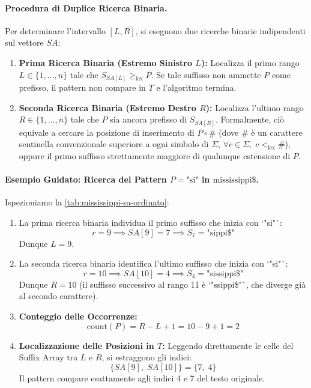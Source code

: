 \paragraph{Procedura di Duplice Ricerca Binaria.}
Per determinare l'intervallo $[L, R]$, si eseguono due ricerche binarie indipendenti sul vettore $SA$:
\begin{enumerate}
  \item \textbf{Prima Ricerca Binaria (Estremo Sinistro $L$):} Localizza il primo rango $L \in \{1, \dots, n\}$ tale che $S_{SA[L]} \ge_{\text{lex}} P$. Se tale suffisso non ammette $P$ come prefisso, il pattern non compare in $T$ e l'algoritmo termina.
  \item \textbf{Seconda Ricerca Binaria (Estremo Destro $R$):} Localizza l'ultimo rango $R \in \{1, \dots, n\}$ tale che $P$ sia ancora prefisso di $S_{SA[R]}$. Formalmente, ci\`o equivale a cercare la posizione di inserimento di $P \circ \#$ (dove $\#$ \`e un carattere sentinella convenzionale superiore a ogni simbolo di $\Sigma$, $\forall c \in \Sigma, \; c <_{\text{lex}} \#$), oppure il primo suffisso strettamente maggiore di qualunque estensione di $P$.
\end{enumerate}

\paragraph{Esempio Guidato: Ricerca del Pattern $P = \text{"si"}$ in $\text{mississippi}\$$.}
Ispezioniamo la \autoref{tab:mississippi-sa-ordinato}:
\begin{enumerate}
  \item La prima ricerca binaria individua il primo suffisso che inizia con `"si"`:
  \begin{equation}
    r = 9 \implies SA[9] = 7 \implies S_7 = \text{"sippi\$"}
  \end{equation}
  Dunque $L = 9$.
  \item La seconda ricerca binaria identifica l'ultimo suffisso che inizia con `"si"`:
  \begin{equation}
    r = 10 \implies SA[10] = 4 \implies S_4 = \text{"sissippi\$"}
  \end{equation}
  Dunque $R = 10$ (il suffisso successivo al rango 11 \`e `"ssippi\$"`, che diverge gi\`a al secondo carattere).
  \item \textbf{Conteggio delle Occorrenze:}
  \begin{equation}
    \text{count}(P) = R - L + 1 = 10 - 9 + 1 = 2
  \end{equation}
  \item \textbf{Localizzazione delle Posizioni in $T$:}
  Leggendo direttamente le celle del Suffix Array tra $L$ e $R$, si estraggono gli indici:
  \begin{equation}
    \{SA[9], \; SA[10]\} = \{7, \; 4\}
  \end{equation}
  Il pattern compare esattamente agli indici 4 e 7 del testo originale.
\end{enumerate}

